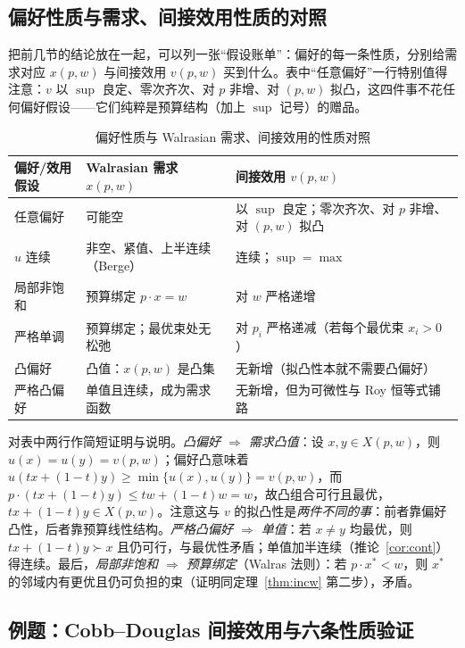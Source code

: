 \subsection{偏好性质与需求、间接效用性质的对照}

把前几节的结论放在一起，可以列一张“假设账单”：偏好的每一条性质，分别给需求对应 $x(p,w)$ 与间接效用 $v(p,w)$ 买到什么。表中“任意偏好”一行特别值得注意：$v$ 以 $\sup$ 良定、零次齐次、对 $p$ 非增、对 $(p,w)$ 拟凸，这四件事不花任何偏好假设——它们纯粹是预算结构（加上 $\sup$ 记号）的赠品。

\begin{table}[H]
\centering
\caption{偏好性质与 Walrasian 需求、间接效用的性质对照}
\begin{tabular}{p{3.1cm}p{5.4cm}p{5.6cm}}
\toprule
偏好/效用假设 & Walrasian 需求 $x(p,w)$ & 间接效用 $v(p,w)$ \\
\midrule
任意偏好 & 可能空 & 以 $\sup$ 良定；零次齐次、对 $p$ 非增、对 $(p,w)$ 拟凸 \\
$u$ 连续 & 非空、紧值、上半连续（Berge） & 连续；$\sup=\max$ \\
局部非饱和 & 预算绑定 $p\cdot x=w$ & 对 $w$ 严格递增 \\
严格单调 & 预算绑定；最优束处无松弛 & 对 $p_i$ 严格递减（若每个最优束 $x_i>0$） \\
凸偏好 & 凸值：$x(p,w)$ 是凸集 & 无新增（拟凸性本就不需要凸偏好） \\
严格凸偏好 & 单值且连续，成为需求函数 & 无新增，但为可微性与 Roy 恒等式铺路 \\
\bottomrule
\end{tabular}
\end{table}

对表中两行作简短证明与说明。\emph{凸偏好 $\Rightarrow$ 需求凸值}：设 $x,y\in X(p,w)$，则 $u(x)=u(y)=v(p,w)$；偏好凸意味着 $u(tx+(1-t)y)\ge\min\{u(x),u(y)\}=v(p,w)$，而 $p\cdot(tx+(1-t)y)\le tw+(1-t)w=w$，故凸组合可行且最优，$tx+(1-t)y\in X(p,w)$。注意这与 $v$ 的拟凸性是\emph{两件不同的事}：前者靠偏好凸性，后者靠预算线性结构。\emph{严格凸偏好 $\Rightarrow$ 单值}：若 $x\ne y$ 均最优，则 $tx+(1-t)y\succ x$ 且仍可行，与最优性矛盾；单值加半连续（推论~\ref{cor:cont}）得连续。最后，\emph{局部非饱和 $\Rightarrow$ 预算绑定}（Walras 法则）：若 $p\cdot x^*<w$，则 $x^*$ 的邻域内有更优且仍可负担的束（证明同定理~\ref{thm:incw} 第二步），矛盾。

\subsection{例题：Cobb--Douglas 间接效用与六条性质验证}

